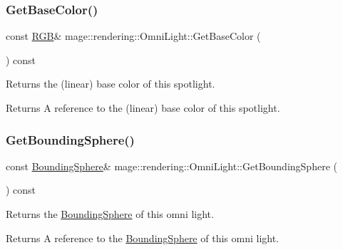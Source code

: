 \subsubsection{\texorpdfstring{Get\+Base\+Color()}{GetBaseColor()}\hspace{0.1cm}{\footnotesize\ttfamily [2/2]}}
{\footnotesize\ttfamily const \mbox{\hyperlink{structmage_1_1_r_g_b}{R\+GB}}\& mage\+::rendering\+::\+Omni\+Light\+::\+Get\+Base\+Color (\begin{DoxyParamCaption}{ }\end{DoxyParamCaption}) const\hspace{0.3cm}{\ttfamily [noexcept]}}

Returns the (linear) base color of this spotlight.

\begin{DoxyReturn}{Returns}
A reference to the (linear) base color of this spotlight. 
\end{DoxyReturn}
\mbox{\label{classmage_1_1rendering_1_1_omni_light_aaecee74a14aae5015f8bc738727162ee}} 
\subsubsection{\texorpdfstring{Get\+Bounding\+Sphere()}{GetBoundingSphere()}}
{\footnotesize\ttfamily const \mbox{\hyperlink{classmage_1_1_bounding_sphere}{Bounding\+Sphere}}\& mage\+::rendering\+::\+Omni\+Light\+::\+Get\+Bounding\+Sphere (\begin{DoxyParamCaption}{ }\end{DoxyParamCaption}) const\hspace{0.3cm}{\ttfamily [noexcept]}}

Returns the \mbox{\hyperlink{classmage_1_1_bounding_sphere}{Bounding\+Sphere}} of this omni light.

\begin{DoxyReturn}{Returns}
A reference to the \mbox{\hyperlink{classmage_1_1_bounding_sphere}{Bounding\+Sphere}} of this omni light. 
\end{DoxyReturn}
\mbox{\label{classmage_1_1rendering_1_1_omni_light_a30b6cbf1fd7a6058856a491c2ce75005}} 
